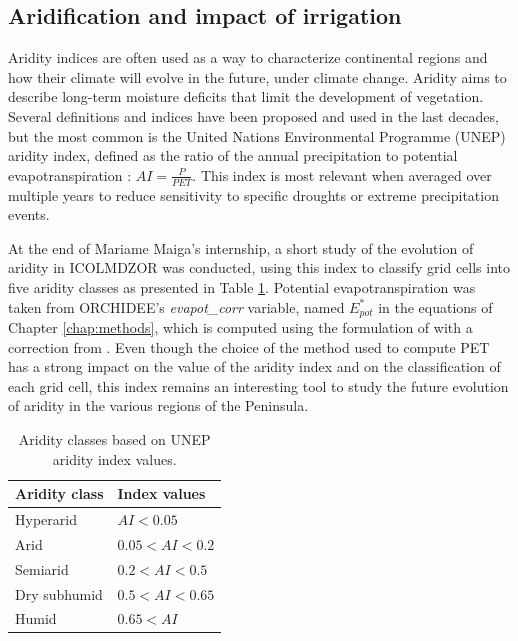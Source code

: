\clearpage

\subsection{Aridification and impact of irrigation}

Aridity indices are often used as a way to characterize continental regions and how their climate will evolve in the future, under climate change. Aridity aims to describe long-term moisture deficits that limit the development of vegetation. Several definitions and indices have been proposed and used in the last decades, but the most common is the United Nations Environmental Programme (UNEP) aridity index, defined as the ratio of the annual precipitation to potential evapotranspiration : $AI = \frac{P}{PET}$. %
This index is most relevant when averaged over multiple years to reduce sensitivity to specific droughts or extreme precipitation events.

At the end of Mariame Maiga's internship, a short study of the evolution of aridity in ICOLMDZOR was conducted, using this index to classify grid cells into five aridity classes as presented in Table \ref{table:aridity_classes}. 
Potential evapotranspiration was taken from ORCHIDEE's \textit{evapot\_corr} variable, named $E_{pot}^*$ in the equations of Chapter \ref{chap:methods}, which is computed using the formulation of \citet{Budyko_1956} with a correction from \citet{milly_potential_1992}. 
Even though the choice of the method used to compute PET has a strong impact on the value of the aridity index and on the classification of each grid cell, this index remains an interesting tool to study the future evolution of aridity in the various regions of the Peninsula.

\begin{table}[h]
    \centering
    \begin{tabular}{|l|l|}
        \hline
        \textbf{Aridity class} & \textbf{Index values} \\
        \hline
        Hyperarid & \( AI < 0.05 \) \\
        \hline
        Arid & \( 0.05 < AI < 0.2 \) \\
        \hline
        Semiarid & \( 0.2 < AI < 0.5 \) \\
        \hline
        Dry subhumid & \( 0.5 < AI < 0.65 \) \\
        \hline
        Humid & \( 0.65 < AI \) \\
        \hline
    \end{tabular}
    \caption{Aridity classes based on UNEP aridity index values.}
    \label{table:aridity_classes}
\end{table}

